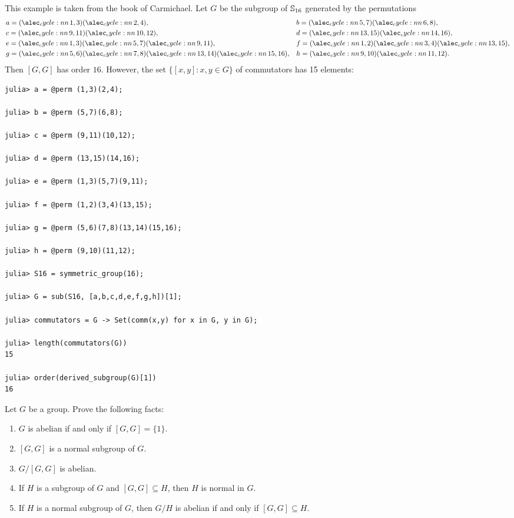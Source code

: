 \begin{example}
This example is taken from the book \cite{MR0075938} of Carmichael. 
Let $G$ be the subgroup of $\mathbb{S}_{16}$ generated by the permutations
\begin{align*}
&a = \cycle{1,3}\cycle{2,4},&&
b = \cycle{5,7}\cycle{6,8},\\
&c = \cycle{9,11}\cycle{10,12},&&
d = \cycle{13,15}\cycle{14,16},\\
&e = \cycle{1,3}\cycle{5,7}\cycle{9,11},&&
f = \cycle{1,2}\cycle{3,4}\cycle{13,15},\\
&g = \cycle{5,6}\cycle{7,8}\cycle{13,14}\cycle{15,16},&&
h =\cycle{9,10}\cycle{11,12}.
\end{align*}
Then $[G,G]$ has order $16$. However, 
the set $\{[x,y]:x,y\in G\}$ of commutators has 15 elements:
\begin{lstlisting}
julia> a = @perm (1,3)(2,4);

julia> b = @perm (5,7)(6,8);

julia> c = @perm (9,11)(10,12);

julia> d = @perm (13,15)(14,16);

julia> e = @perm (1,3)(5,7)(9,11);

julia> f = @perm (1,2)(3,4)(13,15);

julia> g = @perm (5,6)(7,8)(13,14)(15,16);

julia> h = @perm (9,10)(11,12);
   
julia> S16 = symmetric_group(16);

julia> G = sub(S16, [a,b,c,d,e,f,g,h])[1];

julia> commutators = G -> Set(comm(x,y) for x in G, y in G);

julia> length(commutators(G))
15

julia> order(derived_subgroup(G)[1])
16
\end{lstlisting}
\end{example}


\begin{exercise}
    Let $G$ be a group. 
    Prove the following facts:
    \begin{enumerate}
        \item $G$ is abelian if and only if $[G,G]=\{1\}$.
        \item $[G,G]$ is a normal subgroup of $G$. 
        \item $G/[G,G]$ is abelian. 
        \item If $H$ is a subgroup of $G$ and $[G,G]\subseteq H$, then 
        $H$ is normal in $G$.
        \item If $H$ is a normal subgroup of $G$, then 
        $G/H$ is abelian if and only if $[G,G]\subseteq H$. 
    \end{enumerate}
\end{exercise}

